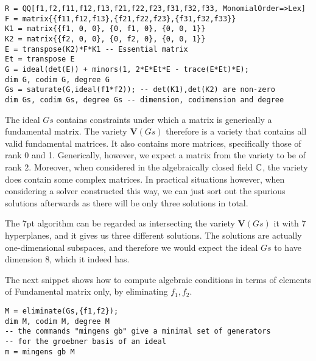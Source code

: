 \begin{verbatim}
R = QQ[f1,f2,f11,f12,f13,f21,f22,f23,f31,f32,f33, MonomialOrder=>Lex]
F = matrix{{f11,f12,f13},{f21,f22,f23},{f31,f32,f33}}
K1 = matrix{{f1, 0, 0}, {0, f1, 0}, {0, 0, 1}}
K2 = matrix{{f2, 0, 0}, {0, f2, 0}, {0, 0, 1}}
E = transpose(K2)*F*K1 -- Essential matrix
Et = transpose E
G = ideal(det(E)) + minors(1, 2*E*Et*E - trace(E*Et)*E); 
dim G, codim G, degree G
Gs = saturate(G,ideal(f1*f2)); -- det(K1),det(K2) are non-zero
dim Gs, codim Gs, degree Gs -- dimension, codimension and degree
\end{verbatim}

The ideal $Gs$ contains constraints under which a matrix is generically a fundamental matrix. The variety $\textbf{V}(Gs)$ therefore is a variety that contains all valid fundamental matrices. It also contains more matrices, specifically those of rank 0 and 1. Generically, however, we expect a matrix from the variety to be of rank 2. Moreover, when considered in the algebraically closed field $\mathbb{C}$, the variety does contain some complex matrices. In practical situations however, when considering a solver constructed this way, we can just sort out the spurious solutions afterwards as there will be only three solutions in total.

The 7pt algorithm can be regarded as intersecting the variety $\textbf{V}(Gs)$ it with 7 hyperplanes, and it gives us three different solutions. The solutions are actually one-dimensional subspaces, and therefore we would expect the ideal $Gs$ to have dimension 8, which it indeed has.

The next snippet shows how to compute algebraic conditions in terms of elements of Fundamental matrix only, by eliminating $f_1,f_2$.

\begin{verbatim}
M = eliminate(Gs,{f1,f2}); 
dim M, codim M, degree M
-- the commands "mingens gb" give a minimal set of generators 
-- for the groebner basis of an ideal 
m = mingens gb M
\end{verbatim}

